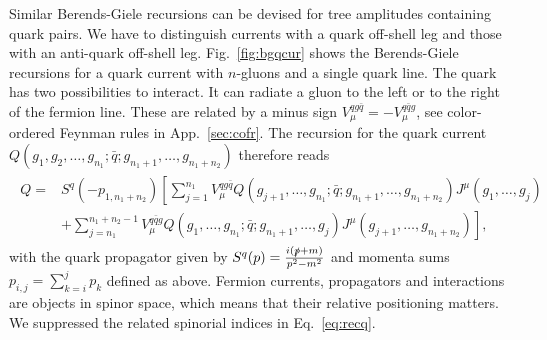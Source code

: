 Similar Berends-Giele recursions can be devised for tree amplitudes
containing quark pairs. We have to distinguish currents with a
quark off-shell leg and those with an anti-quark off-shell leg. Fig.~\ref{fig:bgqcur} shows the
Berends-Giele recursions for a quark current with $n$-gluons and a
single quark line. The quark has two possibilities to interact. It can
radiate a gluon to the left or to the
right of the fermion line. These are related by a minus sign
$V_{\mu}^{qg\bar{q}}=-V_{\mu}^{q\bar{q}g}$, see color-ordered Feynman rules in App.~\ref{sec:cofr}. The recursion for the quark current
$Q(g_1,g_2,\dots,g_{n_1};\bar{q};g_{n_1+1},\dots,g_{n_1+n_2})$
therefore reads
\begin{align}\label{eq:recq}
\begin{split}
  Q =&
S^{q}(-p_{1,n_1+n_2})\left[\sum_{j=1}^{n_1}V_{\mu}^{qg\bar{q}}Q(g_{j+1},\dots,g_{n_1};\bar{q};g_{n_1+1},\dots,g_{n_1+n_2})J^\mu(g_1,\dots,g_j)\right.\\
 &\left.+\sum_{j=n_1}^{n_1+n_2-1}V_{\mu}^{q\bar{q}g}Q(g_{1},\dots,g_{n_1};\bar{q};g_{n_1+1},\dots,g_{j})J^\mu(g_{j+1},\dots,g_{n_1+n_2})\right],
\end{split}
\end{align}
with the quark propagator given by $S^{q}(p)=\frac{i(\slashed{p}+m)}{p^2-m^2}$ and momenta sums
$p_{i,j}=\sum_{k=i}^jp_k$ defined as above. Fermion currents, propagators
and interactions are objects in
spinor space, which means that their relative positioning matters. We suppressed the related spinorial indices in Eq.~\eqref{eq:recq}.

